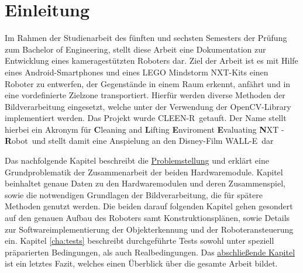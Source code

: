 \chapter{Einleitung}
\label{cha:einleitung}

Im Rahmen der Studienarbeit des fünften und sechsten Semesters der Prüfung zum Bachelor of Engineering, stellt diese Arbeit eine Dokumentation zur Entwicklung eines kameragestützten Roboters dar. Ziel der Arbeit ist es mit Hilfe eines Android-Smartphones und eines LEGO Mindstorm NXT-Kits einen Roboter zu entwerfen, der Gegenstände in einem Raum erkennt, anfährt und in eine vordefinierte Zielzone transportiert. Hierfür werden diverse Methoden der Bildverarbeitung eingesetzt, welche unter der Verwendung der OpenCV-Library \cite{opencv_library} implementiert werden. Das Projekt wurde \glqq CLEEN-R\grqq\ getauft. Der Name stellt hierbei ein Akronym für \glqq \textbf{C}leaning and \textbf{L}ifting \textbf{E}nviroment \textbf{E}valuating \textbf{N}XT - \textbf{R}obot\grqq\ und stellt damit eine Anspielung an den Disney-Film \glqq WALL-E\grqq\ dar

Das nachfolgende Kapitel beschreibt die \hyperref[cha:Problemstellung]{Problemstellung} und erklärt eine Grundproblematik der Zusammenarbeit der beiden Hardwaremodule. Kapitel  beinhaltet genaue Daten zu den Hardwaremodulen und deren Zusammenspiel, sowie die notwendigen Grundlagen der Bildverarbeitung, die für spätere Methoden genutzt werden. Die beiden darauf folgenden Kapitel gehen gesondert auf den genauen Aufbau des Roboters samt Konstruktionsplänen, sowie Details zur Softwareimplementierung der Objekterkennung und der Roboteransteuerung ein. Kapitel \ref{cha:tests} beschreibt durchgeführte Tests sowohl unter speziell präparierten Bedingungen, als auch Realbedingungen. Das \hyperref[cha:Fazit]{abschließende Kapitel} ist ein letztes Fazit, welches einen Überblick über die gesamte Arbeit bildet.



